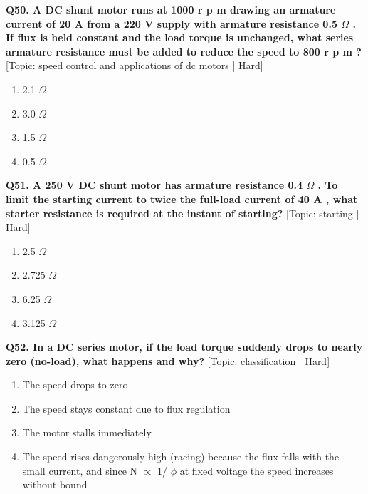 \noindent\textbf{Q50. A DC shunt motor runs at 1000 r p m drawing an armature current of 20 A from a 220 V supply with armature resistance 0.5 $\Omega$ . If flux is held constant and the load torque is unchanged, what series armature resistance must be added to reduce the speed to 800 r p m ?} \hfill [Topic: speed control and applications of dc motors | Hard]
\begin{enumerate}[label=(\alph*),topsep=2pt,itemsep=1pt,partopsep=0pt,parsep=0pt]
    \item {2.1 $\Omega$}
    \item {3.0 $\Omega$}
    \item {1.5 $\Omega$}
    \item {0.5 $\Omega$}
\end{enumerate}
\vspace{2mm}

\noindent\textbf{Q51. A 250 V DC shunt motor has armature resistance 0.4 $\Omega$ . To limit the starting current to twice the full-load current of 40 A , what starter resistance is required at the instant of starting?} \hfill [Topic: starting | Hard]
\begin{enumerate}[label=(\alph*),topsep=2pt,itemsep=1pt,partopsep=0pt,parsep=0pt]
    \item {2.5 $\Omega$}
    \item {2.725 $\Omega$}
    \item {6.25 $\Omega$}
    \item {3.125 $\Omega$}
\end{enumerate}
\vspace{2mm}

\noindent\textbf{Q52. In a DC series motor, if the load torque suddenly drops to nearly zero (no-load), what happens and why?} \hfill [Topic: classification | Hard]
\begin{enumerate}[label=(\alph*),topsep=2pt,itemsep=1pt,partopsep=0pt,parsep=0pt]
    \item {The speed drops to zero}
    \item {The speed stays constant due to flux regulation}
    \item {The motor stalls immediately}
    \item {The speed rises dangerously high (racing) because the flux falls with the small current, and since N $\propto$ 1/ $\phi$ at fixed voltage the speed increases without bound}
\end{enumerate}
\vspace{2mm}

